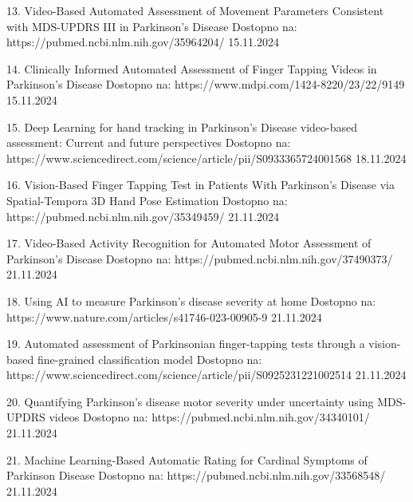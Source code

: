 13. Video-Based Automated Assessment of Movement Parameters Consistent with MDS-UPDRS III in Parkinson's Disease
Dostopno na: https://pubmed.ncbi.nlm.nih.gov/35964204/
15.11.2024

14. Clinically Informed Automated Assessment of Finger Tapping Videos in Parkinson’s Disease
Dostopno na: https://www.mdpi.com/1424-8220/23/22/9149
15.11.2024

15. Deep Learning for hand tracking in Parkinson’s Disease video-based assessment: Current and future perspectives
Dostopno na: https://www.sciencedirect.com/science/article/pii/S0933365724001568
18.11.2024

16. Vision-Based Finger Tapping Test in Patients With Parkinson’s Disease via Spatial-Tempora 3D Hand Pose Estimation
Dostopno na: https://pubmed.ncbi.nlm.nih.gov/35349459/
21.11.2024

17. Video-Based Activity Recognition for Automated Motor Assessment of Parkinson’s Disease
Dostopno na: https://pubmed.ncbi.nlm.nih.gov/37490373/
21.11.2024

18. Using AI to measure Parkinson’s disease severity at home
Dostopno na: https://www.nature.com/articles/s41746-023-00905-9
21.11.2024

19. Automated assessment of Parkinsonian finger-tapping tests through a vision-based fine-grained classification model
Dostopno na: https://www.sciencedirect.com/science/article/pii/S0925231221002514
21.11.2024

20. Quantifying Parkinson's disease motor severity under uncertainty using MDS-UPDRS videos
Dostopno na: https://pubmed.ncbi.nlm.nih.gov/34340101/
21.11.2024

21. Machine Learning-Based Automatic Rating for Cardinal Symptoms of Parkinson Disease
Dostopno na: https://pubmed.ncbi.nlm.nih.gov/33568548/
21.11.2024


